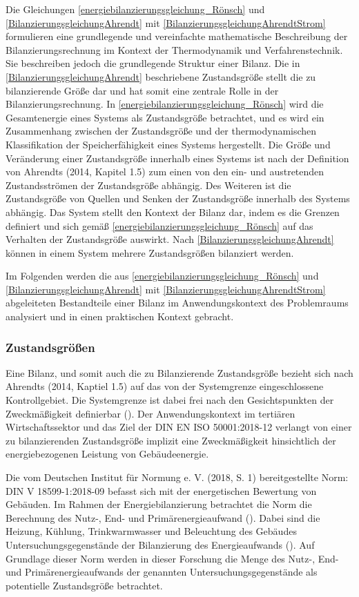 Die Gleichungen \eqref{energiebilanzierungsgleichung_Rönsch} und \eqref{BilanzierungsgleichungAhrendt} mit \eqref{BilanzierungsgleichungAhrendtStrom} 
formulieren eine grundlegende und vereinfachte mathematische Beschreibung der Bilanzierungsrechnung im Kontext der Thermodynamik und Verfahrenstechnik. 
Sie beschreiben jedoch die grundlegende Struktur einer Bilanz. 
Die in \eqref{BilanzierungsgleichungAhrendt} beschriebene Zustandsgröße stellt die zu bilanzierende Größe dar und hat somit eine zentrale Rolle in der 
Bilanzierungsrechnung. In \eqref{energiebilanzierungsgleichung_Rönsch} wird die Gesamtenergie eines Systems als Zustandsgröße betrachtet, 
und es wird ein Zusammenhang zwischen der Zustandsgröße und der thermodynamischen Klassifikation der Speicherfähigkeit eines Systems hergestellt.
Die Größe und Veränderung einer Zustandsgröße innerhalb eines Systems ist nach der Definition von Ahrendts (2014, Kapitel 1.5) zum einen  
von den ein- und austretenden Zustandsströmen der Zustandsgröße abhängig. 
Des Weiteren ist die Zustandsgröße von Quellen und Senken der Zustandsgröße innerhalb des Systems abhängig.
Das System stellt den Kontext der Bilanz dar, indem es die Grenzen definiert und sich gemäß \eqref{energiebilanzierungsgleichung_Rönsch} auf das Verhalten der 
Zustandsgröße auswirkt. Nach \eqref{BilanzierungsgleichungAhrendt} können in einem System mehrere Zustandsgrößen bilanziert werden.

Im Folgenden werden die aus \eqref{energiebilanzierungsgleichung_Rönsch} und \eqref{BilanzierungsgleichungAhrendt} mit \eqref{BilanzierungsgleichungAhrendtStrom} 
abgeleiteten Bestandteile einer Bilanz im Anwendungskontext des Problemraums analysiert und in einen praktischen Kontext gebracht. 

\subsubsection{Zustandsgrößen}
Eine Bilanz, und somit auch die zu Bilanzierende Zustandsgröße bezieht sich nach Ahrendts (2014, Kaptiel 1.5) auf das von der Systemgrenze eingeschlossene Kontrollgebiet. 
Die Systemgrenze ist dabei frei nach den Gesichtspunkten der Zweckmäßigkeit definierbar (\cite[Kapitel 1.5]{Ahrendts.2014}).
Der Anwendungskontext im tertiären Wirtschaftssektor und das Ziel der DIN EN ISO 50001:2018-12 verlangt von einer zu bilanzierenden Zustandsgröße implizit eine 
Zweckmäßigkeit hinsichtlich der energiebezogenen Leistung von Gebäudeenergie.

Die vom Deutschen Institut für Normung e. V. (2018, S. 1) bereitgestellte Norm: DIN V 18599-1:2018-09 befasst sich mit der energetischen Bewertung von 
Gebäuden. Im Rahmen der Energiebilanzierung betrachtet die Norm die Berechnung des Nutz-, End- und Primärenergieaufwand (\cite{DIN18599.2018}). 
Dabei sind die Heizung, Kühlung, Trinkwarmwasser und Beleuchtung des Gebäudes Untersuchungsgegenstände der Bilanzierung des Energieaufwands (\cite{DIN18599.2018}). 
Auf Grundlage dieser Norm werden in dieser Forschung die Menge des Nutz-, End- und Primärenergieaufwands der genannten Untersuchungsgegenstände als potentielle 
Zustandsgröße betrachtet.

